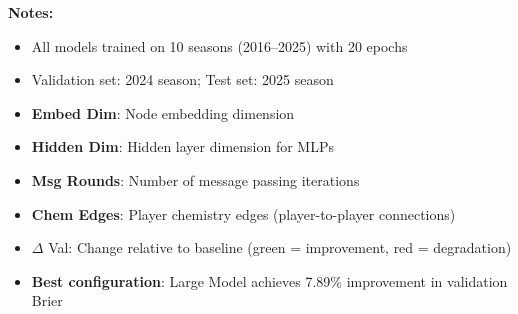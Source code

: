\begin{table}[htbp]
\vspace{0.5em}
\begin{minipage}{\textwidth}
\footnotesize
\textbf{Notes:}
\begin{itemize}[leftmargin=*, noitemsep, topsep=0pt]
    \item All models trained on 10 seasons (2016--2025) with 20 epochs
    \item Validation set: 2024 season; Test set: 2025 season
    \item \textbf{Embed Dim}: Node embedding dimension
    \item \textbf{Hidden Dim}: Hidden layer dimension for MLPs
    \item \textbf{Msg Rounds}: Number of message passing iterations
    \item \textbf{Chem Edges}: Player chemistry edges (player-to-player connections)
    \item $\Delta$ Val: Change relative to baseline (green = improvement, red = degradation)
    \item \textbf{Best configuration}: Large Model achieves 7.89\% improvement in validation Brier
\end{itemize}
\end{minipage}
\end{table}
